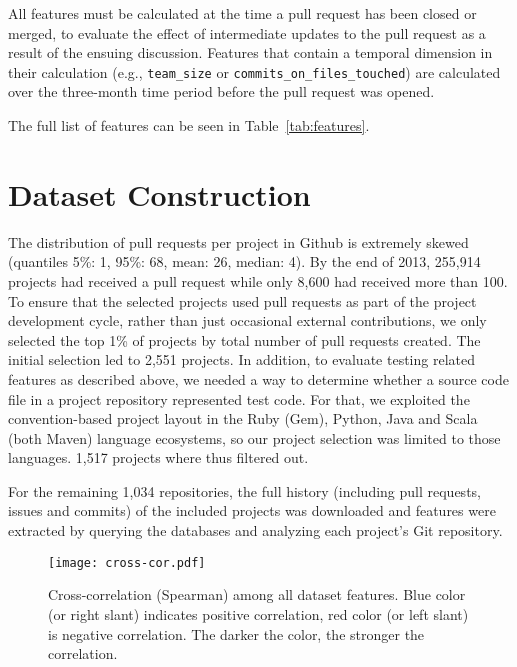 \documentclass{sig-alternate}
\begin{document}
All features must be calculated at the time a pull request has been closed or
merged, to evaluate the effect of intermediate updates to the pull request as a
result of the ensuing discussion. Features that contain a temporal dimension in
their calculation (e.g., \texttt{team\_size} or
\texttt{commits\_on\_files\_touched}) are calculated over the three-month time
period before the pull request was opened.

The full list of features can be seen in Table~\ref{tab:features}.


\section{Dataset Construction}

The distribution of pull requests per project in Github is extremely skewed
(quantiles 5\%: 1, 95\%: 68, mean: 26, median: 4). By the end of 2013, 255,914
projects had received a pull request while only 8,600 had received more than
100. To ensure that the selected projects used pull requests as part of the
project development cycle, rather than just occasional external contributions,
we only selected the top 1\% of projects by total number of pull requests
created. The initial selection led to 2,551 projects.
In addition, to evaluate testing related features as described above,
we needed a way to determine whether a source code file in a project
repository represented test code.
For that, we exploited the
convention-based project layout in the Ruby (Gem), Python, Java and Scala (both
Maven) language ecosystems, so our project selection was limited to those
languages. 1,517 projects where thus filtered out.

For the remaining 1,034 repositories, the full history (including pull requests,
issues and commits) of the included projects was downloaded and features were
extracted by querying the \ghtorrent databases and analyzing each project's Git
repository.

\begin{figure}
  \begin{center}
    \texttt{[image: cross-cor.pdf]}
  \end{center}
  \caption{Cross-correlation (Spearman) among all dataset features. Blue color (or right slant) indicates positive correlation, red color (or left slant) is negative correlation. The darker the color, the stronger the correlation.}
  \label{fig:features}
\end{figure}
\end{document}
